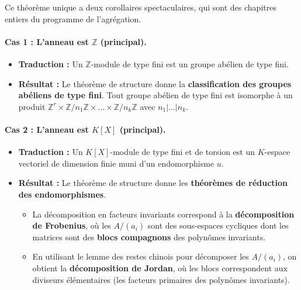\begin{application}
    Ce théorème unique a deux corollaires spectaculaires, qui sont des chapitres entiers du programme de l'agrégation.
    
    \paragraph{Cas 1 : L'anneau est $\mathbb{Z}$ (principal).}
    \begin{itemize}
        \item \textbf{Traduction :} Un $\mathbb{Z}$-module de type fini est un groupe abélien de type fini.
        \item \textbf{Résultat :} Le théorème de structure donne la \textbf{classification des groupes abéliens de type fini}.
        Tout groupe abélien de type fini est isomorphe à un produit $\mathbb{Z}^r \times \mathbb{Z}/n_1\mathbb{Z} \times \dots \times \mathbb{Z}/n_k\mathbb{Z}$ avec $n_1 | \dots | n_k$.
    \end{itemize}

    \paragraph{Cas 2 : L'anneau est $K[X]$ (principal).}
    \begin{itemize}
        \item \textbf{Traduction :} Un $K[X]$-module de type fini et de torsion est un $K$-espace vectoriel de dimension finie muni d'un endomorphisme $u$.
        \item \textbf{Résultat :} Le théorème de structure donne les \textbf{théorèmes de réduction des endomorphismes}.
            \begin{itemize}
                \item La décomposition en facteurs invariants correspond à la \textbf{décomposition de Frobenius}, où les $A/(a_i)$ sont des sous-espaces cycliques dont les matrices sont des \textbf{blocs compagnons} des polynômes invariants.
                \item En utilisant le lemme des restes chinois pour décomposer les $A/(a_i)$, on obtient la \textbf{décomposition de Jordan}, où les blocs correspondent aux diviseurs élémentaires (les facteurs primaires des polynômes invariants).
            \end{itemize}
    \end{itemize}
\end{application}

